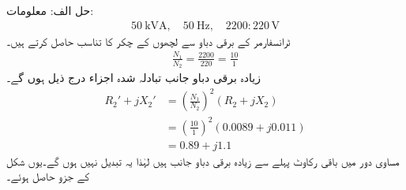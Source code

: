 حل الف:\quad
معلومات:
\begin{align*}
\SI{50}{\kilo \volt \ampere}, \quad \SI{50}{\hertz}, \quad 2200:220\,\si{\volt}
\end{align*}
ٹرانسفارمر کے  برقی دباو سے لچھوں کے چکر کا تناسب حاصل کرتے ہیں۔
\begin{align*}
\frac{N_1}{N_2}=\frac{2200}{220}=\frac{10}{1}
\end{align*}
زیادہ برقی دباو جانب تبادلہ شدہ اجزاء درج ذیل ہوں گے۔
\begin{align*}
R_2'+j X_2' &=\left(\frac{N_1}{N_2} \right)^2 \left(R_2+j X_2 \right)\\
&=\left(\frac{10}{1} \right)^2 \left(0.0089+j 0.011 \right)\\
&=0.89+j 1.1
\end{align*}
مساوی دور میں باقی  رکاوٹ پہلے سے زیادہ برقی دباو جانب ہیں لہٰذا یہ تبدیل نہیں ہوں گے۔یوں شکل   کے جزو حاصل ہوئے۔

